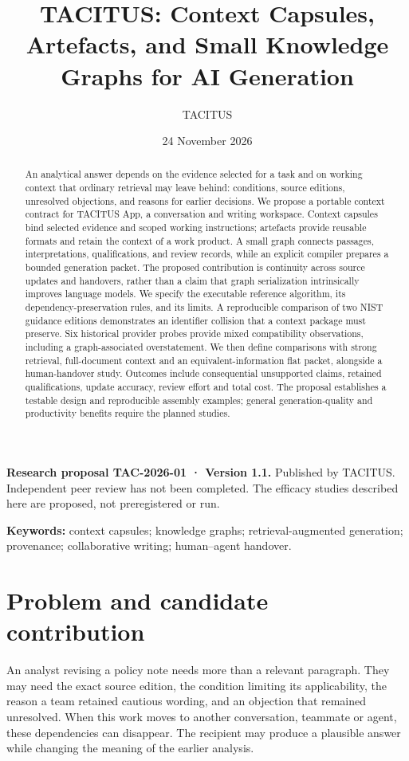 \documentclass[
  11pt,
]{article}
\title{TACITUS: Context Capsules, Artefacts, and Small Knowledge Graphs
for AI Generation}
\author{TACITUS}
\date{24 November 2026}
\let\originalsection\section
\renewcommand{\section}{\Needspace{5\baselineskip}\originalsection}
\begin{document}
\maketitle
\begin{abstract}
An analytical answer depends on the evidence selected for a task and on
working context that ordinary retrieval may leave behind: conditions,
source editions, unresolved objections, and reasons for earlier
decisions. We propose a portable context contract for TACITUS App, a
conversation and writing workspace. Context capsules bind selected
evidence and scoped working instructions; artefacts provide reusable
formats and retain the context of a work product. A small graph connects
passages, interpretations, qualifications, and review records, while an
explicit compiler prepares a bounded generation packet. The proposed
contribution is continuity across source updates and handovers, rather
than a claim that graph serialization intrinsically improves language
models. We specify the executable reference algorithm, its
dependency-preservation rules, and its limits. A reproducible comparison
of two NIST guidance editions demonstrates an identifier collision that
a context package must preserve. Six historical provider probes provide
mixed compatibility observations, including a graph-associated
overstatement. We then define comparisons with strong retrieval,
full-document context and an equivalent-information flat packet,
alongside a human-handover study. Outcomes include consequential
unsupported claims, retained qualifications, update accuracy, review
effort and total cost. The proposal establishes a testable design and
reproducible assembly examples; general generation-quality and
productivity benefits require the planned studies.
\end{abstract}

\textbf{Research proposal TAC-2026-01 · Version 1.1.} Published by
TACITUS. Independent peer review has not been completed. The efficacy
studies described here are proposed, not preregistered or run.

\textbf{Keywords:} context capsules; knowledge graphs;
retrieval-augmented generation; provenance; collaborative writing;
human--agent handover.

\section{Problem and candidate
contribution}\label{problem-and-candidate-contribution}

An analyst revising a policy note needs more than a relevant paragraph.
They may need the exact source edition, the condition limiting its
applicability, the reason a team retained cautious wording, and an
objection that remained unresolved. When this work moves to another
conversation, teammate or agent, these dependencies can disappear. The
recipient may produce a plausible answer while changing the meaning of
the earlier analysis.
\end{document}

